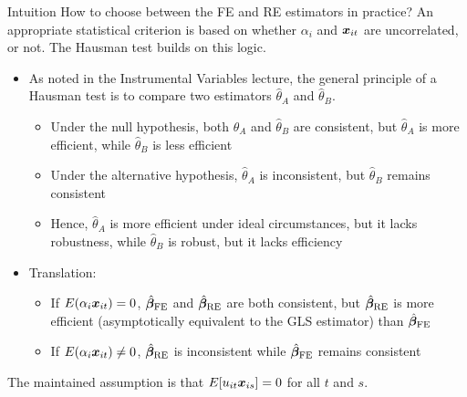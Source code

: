\documentclass[english, professionalfonts,smaller,xcolor=dvipsnames]{beamer}
\begin{document}
\begin{frame}{Intuition}
How to choose between the FE and RE estimators in practice? An appropriate statistical criterion is based on whether $\alpha_i$ and $\bm x_{it}$ are uncorrelated, or not. The Hausman test builds on this logic.

\begin{itemize}
\item As noted in the Instrumental Variables lecture, the general principle of a Hausman test is to compare two estimators $\hat\theta_A$ and $\hat\theta_B$.
\begin{itemize}
\item Under the null hypothesis, both $\hat\theta_A$ and $\hat\theta_B$ are consistent, but $\hat\theta_A$ is more efficient, while $\hat\theta_B$ is less efficient
\item Under the alternative hypothesis, $\hat\theta_A$ is inconsistent, but $\hat\theta_B$ remains consistent
\item Hence, $\hat\theta_A$ is more efficient under ideal circumstances, but it lacks robustness, while $\hat\theta_B$ is robust, but it lacks efficiency
\end{itemize}
\item Translation:
\begin{itemize}
\item If $E( \alpha_i \bm x_{it})=0$, $\hat{\bm \beta}_{\text{FE}}$ and $\hat{\bm \beta}_{\text{RE}}$ are both consistent, but $\hat{\bm \beta}_{\text{RE}}$ is more efficient (asymptotically equivalent to the GLS estimator) than $\hat{\bm \beta}_{\text{FE}}$
\item If $E( \alpha_i \bm x_{it}) \neq0$, $\hat{\bm \beta}_{\text{RE}}$ is inconsistent while $\hat{\bm \beta}_{\text{FE}}$ remains consistent
\end{itemize}
\end{itemize}
The maintained assumption is that $E[u_{it} \bm x_{is}] =0$ for all $t$ and $s$.
\end{frame}
\end{document}
